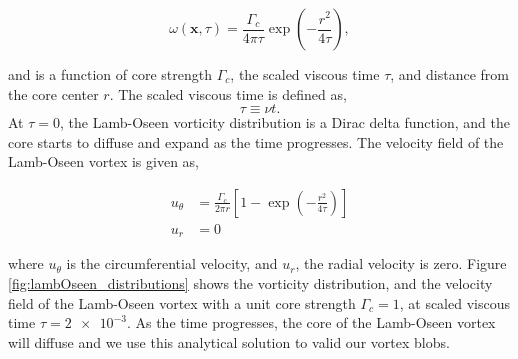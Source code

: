 	\begin{equation}
	\omega\left(\mathbf{x},\tau\right) = \frac{\Gamma_c}{4\pi\tau} \exp\left(-\frac{r^2}{4\tau}\right),
	\label{eq:lo_voeq}
	\end{equation}

and is a function of core strength $\Gamma_c$, the scaled viscous time $\tau$, and distance from the core center $r$. The scaled viscous time is defined as,
	\begin{equation}
	\tau \equiv \nu t.
	\end{equation}
At $\tau=0$, the Lamb-Oseen vorticity distribution is a Dirac delta function, and the core starts to diffuse and expand as the time progresses. The velocity field of the Lamb-Oseen vortex is given as,

	\begin{subequations}
	\begin{align}
	u_{\theta} &= \frac{\Gamma_c}{2\pi r} \left[1-\exp\left(-\frac{r^2}{4\tau}\right)\right]\\
	u_r &= 0
	\end{align}
	\label{eq:lo_veeq}
	\end{subequations}

where $u_{\theta}$ is the circumferential velocity, and $u_r$, the radial velocity is zero. Figure \ref{fig:lambOseen_distributions} shows the vorticity distribution, and the velocity field of the Lamb-Oseen vortex with a unit core strength $\Gamma_c=1$, at scaled viscous time $\tau=\num{2e-3}$. As the time progresses, the core of the Lamb-Oseen vortex will diffuse and we use this analytical solution to valid our vortex blobs.

